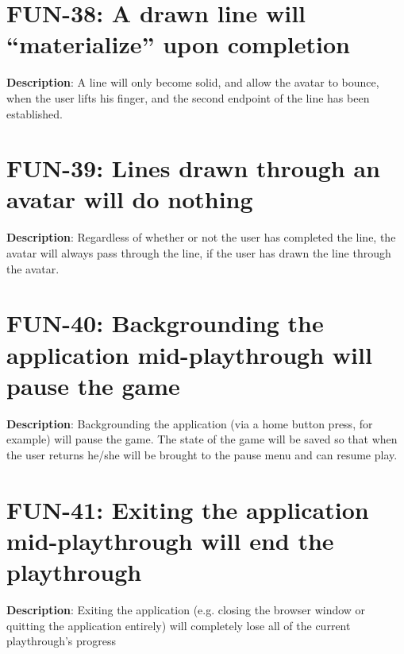 \section{FUN-38: A drawn line will \textquotedblleft{}materialize\textquotedblright{}
upon completion}
\textbf{Description}: A line will only become solid, and allow the
avatar to bounce, when the user lifts his finger, and the second endpoint
of the line has been established.
\section{FUN-39: Lines drawn through an avatar will do nothing}
\textbf{Description}: Regardless of whether or not the user has completed
the line, the avatar will always pass through the line, if the user
has drawn the line through the avatar.
\section{FUN-40: Backgrounding the application mid-playthrough will pause
the game}
\textbf{Description}: Backgrounding the application (via a home button
press, for example) will pause the game. The state of the game will
be saved so that when the user returns he/she will be brought to the
pause menu and can resume play.
\section{FUN-41: Exiting the application mid-playthrough will end the playthrough}
\textbf{Description}: Exiting the application (e.g. closing the browser
window or quitting the application entirely) will completely lose
all of the current playthrough\textquoteright{}s progress